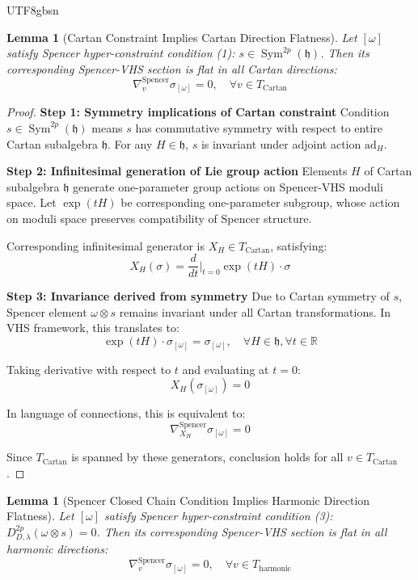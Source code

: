 \documentclass[a4paper,12pt]{extarticle}
\newtheorem{lemma}[theorem]{Lemma}
\theoremstyle{definition}
\begin{document}
\begin{CJK}{UTF8}{gbsn}
\begin{lemma}[Cartan Constraint Implies Cartan Direction Flatness]
\label{lem:cartan_flatness}
Let $[\omega]$ satisfy Spencer hyper-constraint condition (1): $s \in \operatorname{Sym}^{2p}(\mathfrak{h})$. Then its corresponding Spencer-VHS section is flat in all Cartan directions:
$$\nabla^{\text{Spencer}}_{v} \sigma_{[\omega]} = 0, \quad \forall v \in T_{\text{Cartan}}$$
\end{lemma}

\begin{proof}
\textbf{Step 1: Symmetry implications of Cartan constraint}
Condition $s \in \operatorname{Sym}^{2p}(\mathfrak{h})$ means $s$ has commutative symmetry with respect to entire Cartan subalgebra $\mathfrak{h}$. For any $H \in \mathfrak{h}$, $s$ is invariant under adjoint action $\text{ad}_H$.

\textbf{Step 2: Infinitesimal generation of Lie group action}
Elements $H$ of Cartan subalgebra $\mathfrak{h}$ generate one-parameter group actions on Spencer-VHS moduli space. Let $\exp(tH)$ be corresponding one-parameter subgroup, whose action on moduli space preserves compatibility of Spencer structure.

Corresponding infinitesimal generator is $X_H \in T_{\text{Cartan}}$, satisfying:
$$X_H(\sigma) = \frac{d}{dt}\bigg|_{t=0} \exp(tH) \cdot \sigma$$

\textbf{Step 3: Invariance derived from symmetry}
Due to Cartan symmetry of $s$, Spencer element $\omega \otimes s$ remains invariant under all Cartan transformations. In VHS framework, this translates to:
$$\exp(tH) \cdot \sigma_{[\omega]} = \sigma_{[\omega]}, \quad \forall H \in \mathfrak{h}, \forall t \in \mathbb{R}$$

Taking derivative with respect to $t$ and evaluating at $t=0$:
$$X_H(\sigma_{[\omega]}) = 0$$

In language of connections, this is equivalent to:
$$\nabla^{\text{Spencer}}_{X_H} \sigma_{[\omega]} = 0$$

Since $T_{\text{Cartan}}$ is spanned by these generators, conclusion holds for all $v \in T_{\text{Cartan}}$.
\end{proof}

\begin{lemma}[Spencer Closed Chain Condition Implies Harmonic Direction Flatness]
\label{lem:harmonic_flatness}
Let $[\omega]$ satisfy Spencer hyper-constraint condition (3): $D^{2p}_{D,\lambda}(\omega \otimes s) = 0$. Then its corresponding Spencer-VHS section is flat in all harmonic directions:
$$\nabla^{\text{Spencer}}_{v} \sigma_{[\omega]} = 0, \quad \forall v \in T_{\text{harmonic}}$$
\end{lemma}


\end{CJK}
\end{document}
